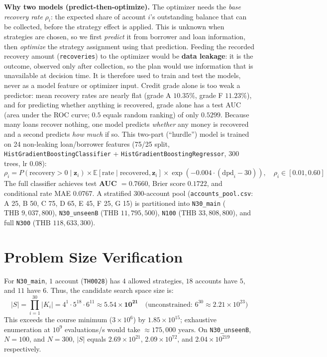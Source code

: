 \documentclass[10pt,a4paper]{article}
\begin{document}
\textbf{Why two models (predict-then-optimize).} The optimizer needs the \emph{base recovery rate} $\rho_i$: the expected share of account $i$'s outstanding balance that can be collected, before the strategy effect is applied. This is unknown when strategies are chosen, so we first \emph{predict} it from borrower and loan information, then \emph{optimize} the strategy assignment using that prediction. Feeding the recorded recovery amount (\texttt{recoveries}) to the optimizer would be \textbf{data leakage}: it is the outcome, observed only after collection, so the plan would use information that is unavailable at decision time. It is therefore used to train and test the models, never as a model feature or optimizer input. Credit grade alone is too weak a predictor: mean recovery rates are nearly flat (grade A $10.35\%$, grade F $11.23\%$), and for predicting whether anything is recovered, grade alone has a test AUC (area under the ROC curve; $0.5$ equals random ranking) of only $0.5299$. Because many loans recover nothing, one model predicts \emph{whether} any money is recovered and a second predicts \emph{how much} if so. This two-part (``hurdle'') model is trained on 24 non-leaking loan/borrower features (75/25 split, \texttt{HistGradientBoostingClassifier} + \texttt{HistGradientBoostingRegressor}, 300 trees, lr $0.08$):
\begin{equation}
    \rho_i = P(\text{recovery} > 0 \mid \bm{z}_i) \times \mathbb{E}[\text{rate} \mid \text{recovered}, \bm{z}_i] \times \exp(-0.004 \cdot (\text{dpd}_i - 30)), \quad \rho_i \in [0.01, 0.60]
\end{equation}
The full classifier achieves test \textbf{AUC $= 0.7660$}, Brier score $0.1722$, and conditional rate MAE $0.0767$. A stratified 300-account pool (\texttt{accounts\_pool.csv}: A 25, B 50, C 75, D 65, E 45, F 25, G 15) is partitioned into \texttt{N30\_main} ($\text{THB~}9{,}037{,}800$), \texttt{N30\_unseenB} ($\text{THB~}11{,}795{,}500$), \texttt{N100} ($\text{THB~}33{,}808{,}800$), and full \texttt{N300} ($\text{THB~}118{,}633{,}300$).

\section{Problem Size Verification}
For \texttt{N30\_main}, $1$ account (\texttt{TH0028}) has $4$ allowed strategies, $18$ accounts have $5$, and $11$ have $6$. Thus, the candidate search space size is:
\begin{equation}
    |S| = \prod_{i=1}^{30} |K_i| = 4^1 \cdot 5^{18} \cdot 6^{11} \approx \mathbf{5.54 \times 10^{21}} \quad \text{(unconstrained: } 6^{30} \approx 2.21 \times 10^{23}\text{)}
\end{equation}
This exceeds the course minimum ($3 \times 10^6$) by $1.85 \times 10^{15}$; exhaustive enumeration at $10^9$ evaluations/s would take $\approx 175{,}000\text{ years}$. On \texttt{N30\_unseenB}, $N=100$, and $N=300$, $|S|$ equals $2.69\times 10^{21}$, $2.09\times 10^{72}$, and $2.04\times 10^{219}$ respectively.
\end{document}
